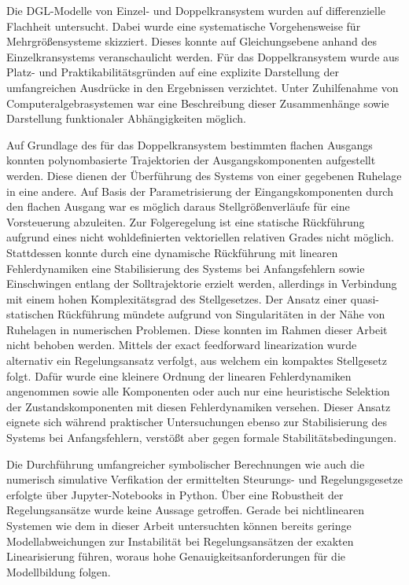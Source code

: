 Die DGL-Modelle von Einzel- und Doppelkransystem wurden auf differenzielle Flachheit untersucht. Dabei wurde eine systematische Vorgehensweise für Mehrgrößensysteme skizziert. Dieses konnte auf Gleichungsebene anhand des Einzelkransystems veranschaulicht werden. Für das Doppelkransystem wurde aus Platz- und Praktikabilitätsgründen auf eine explizite Darstellung der umfangreichen Ausdrücke in den Ergebnissen verzichtet. Unter Zuhilfenahme von Computeralgebrasystemen war eine Beschreibung dieser Zusammenhänge sowie Darstellung funktionaler Abhängigkeiten möglich.

Auf Grundlage des für das Doppelkransystem bestimmten flachen Ausgangs konnten polynombasierte Trajektorien der Ausgangskomponenten aufgestellt werden. Diese dienen der Überführung des Systems von einer gegebenen Ruhelage in eine andere. Auf Basis der Parametrisierung der Eingangskomponenten durch den flachen Ausgang war es möglich daraus Stellgrößenverläufe für eine Vorsteuerung abzuleiten. Zur Folgeregelung ist eine statische Rückführung aufgrund eines nicht wohldefinierten vektoriellen relativen Grades nicht möglich. Stattdessen konnte durch eine dynamische Rückführung mit linearen Fehlerdynamiken eine Stabilisierung des Systems bei Anfangsfehlern sowie Einschwingen entlang der Solltrajektorie erzielt werden, allerdings in Verbindung mit einem hohen Komplexitätsgrad des Stellgesetzes. Der Ansatz einer quasi-statischen Rückführung mündete aufgrund von Singularitäten in der Nähe von Ruhelagen in numerischen Problemen. Diese konnten im Rahmen dieser Arbeit nicht behoben werden. Mittels der exact feedforward linearization wurde alternativ ein Regelungsansatz verfolgt, aus welchem ein kompaktes Stellgesetz folgt. Dafür wurde eine kleinere Ordnung der linearen Fehlerdynamiken angenommen sowie alle Komponenten oder auch nur eine heuristische Selektion der Zustandskomponenten mit diesen Fehlerdynamiken versehen. Dieser Ansatz eignete sich während praktischer Untersuchungen ebenso zur Stabilisierung des Systems bei Anfangsfehlern, verstößt aber gegen formale Stabilitätsbedingungen.

Die Durchführung umfangreicher symbolischer Berechnungen wie auch die numerisch simulative Verfikation der ermittelten Steurungs- und Regelungsgesetze erfolgte über Jupyter-Notebooks in Python. Über eine Robustheit der Regelungsansätze wurde keine Aussage getroffen. Gerade bei nichtlinearen Systemen wie dem in dieser Arbeit untersuchten können bereits geringe Modellabweichungen zur Instabilität bei Regelungsansätzen der exakten Linearisierung führen, woraus hohe Genauigkeitsanforderungen für die Modellbildung folgen.

